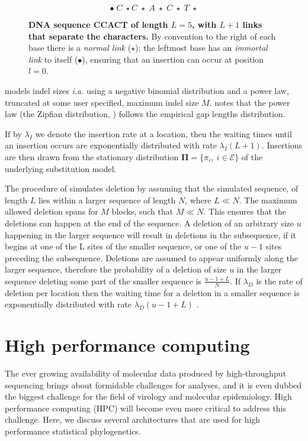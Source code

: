 \begin{figure}
\centering
$$\bullet\; C\;\star C\;\star\; A\;\star\; C\;\star\; T\;\star$$
\caption{
{ \footnotesize 
{\bf DNA sequence CCACT of length $L=5$, with $L+1$ links that separate the characters.} 
By convention to the right of each base there is a \textit{normal link} ($\star$); the leftmost base has an \textit{immortal link} to itself ($\bullet$), ensuring that an insertion can occur at position $l=0$.
} %
}
\label{fig:indels}
\end{figure}

\cite{dawg} models indel sizes \textit{i.a.} using a negative binomial distribution and a power law, truncated at some user specified, maximum indel size $M$.
\cite{Benner1993} notes that the power law (the Zipfian distribution, \cite{Gonnet1991}) follows the empirical gap lengths distribution. 

If by $\lambda_{I}$ we denote the insertion rate at a location, then the waiting times until an insertion occurs are exponentially distributed with rate $\lambda_{I}(L+1)$.
Insertions are then drawn from the stationary distribution $\mathbf{\Pi}=\{\pi_{i},\ i\in\mathcal{E}\}$ of the underlying substitution model.

The procedure of \cite{dawg} simulates deletion by assuming that the simulated sequence, of length $L$ lies within a larger sequence of length $N$, where $L\ll N$.
The maximum allowed deletion spans for $M$ blocks, such that $M \ll N$.
This ensures that the deletions can happen at the end of the sequence.
A deletion of an arbitrary size $u$ happening in the larger sequence will result in deletions in the subsequence, if it begins at one of the L sites of the smaller sequence, or one of the $u-1$ sites preceding the subsequence.
Deletions are assumed to appear uniformly along the larger sequence, therefore the probability of a deletion of size $u$ in the larger sequence deleting some part of the smaller sequence is $\frac{u-1+L}{N}$.
If $\lambda_{D}$ is the rate of deletion per location then the waiting time for a deletion in a smaller sequence is exponentially distributed with rate $\lambda_{D}(u-1+L)$ \citep{dawg}.



\section{High performance computing\label{sec:hpc}}

The ever growing availability of molecular data produced by high-throughput sequencing brings about formidable challenges for analyses, and it is even dubbed the biggest challenge for the field of virology and molecular epidemiology. 
High performance computing (HPC) will become even more critical to address this challenge.
Here, we discuss several architectures that are used for high performance statistical phylogenetics. 

